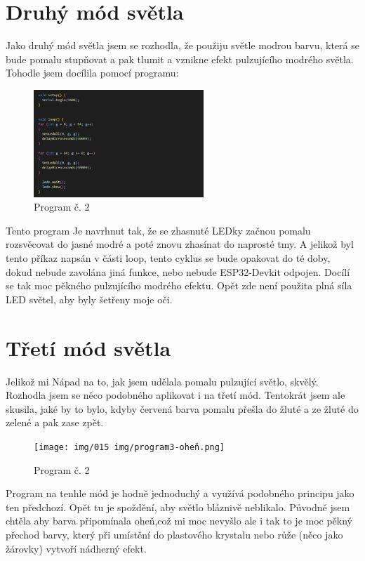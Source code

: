 \section{Druhý mód světla}
Jako druhý mód světla jsem se rozhodla, že použiju světle modrou barvu, která se bude pomalu stupňovat a pak tlumit a vznikne efekt pulzujícího modrého světla. Tohodle jsem docílila pomocí programu: 

\begin{figure}[htbp]
	\centering
	\includegraphics[width=0.57\textwidth]{img/015 img/program2-Ledova-ruze.png}
	\caption{Program č. 2}
\end{figure}


Tento program Je navrhnut tak, že se zhasnuté LEDky začnou pomalu rozsvěcovat do jasné modré a poté znovu zhasínat do naprosté tmy. A jelikož byl tento příkaz napsán v části loop, tento cyklus se bude opakovat do té doby, dokud nebude zavolána jiná funkce, nebo nebude ESP32-Devkit odpojen. Docílí se tak moc pěkného pulzujícího modrého efektu. Opět zde není použita plná síla LED světel, aby byly šetřeny moje oči.  


\section{Třetí mód světla}
Jelikož mi Nápad na to, jak jsem udělala pomalu pulzující světlo, skvělý. Rozhodla jsem se něco podobného aplikovat i na třetí mód. Tentokrát jsem ale skusila, jaké by to bylo, kdyby červená barva pomalu přešla do žluté a ze žluté do zelené a pak zase zpět. 

\begin{figure}[htbp]
	\centering
	\texttt{[image: img/015 img/program3-oheň.png]}
	\caption{Program č. 2}
\end{figure}

Program na tenhle mód je hodně jednoduchý a využívá podobného principu jako ten předchozí. Opět tu je spoždění, aby světlo bláznivě neblikalo. Původně jsem chtěla aby barva připomínala oheň,což mi moc nevyšlo ale i tak to je moc pěkný přechod barvy, který při umístění do plastového krystalu nebo růže (něco jako žárovky) vytvoří nádherný efekt.


